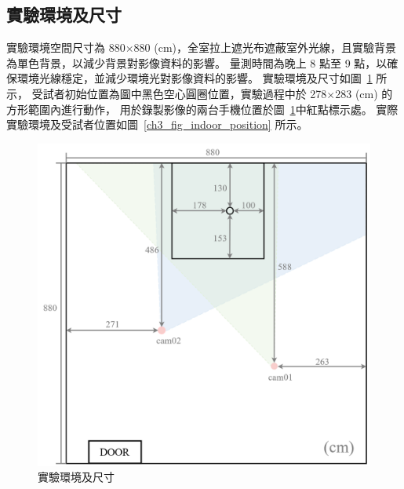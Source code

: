 
\subsection{實驗環境及尺寸}
實驗環境空間尺寸為 880$\times$880 (cm)，全室拉上遮光布遮蔽室外光線，且實驗背景為單色背景，以減少背景對影像資料的影響。
量測時間為晚上 8 點至 9 點，以確保環境光線穩定，並減少環境光對影像資料的影響。
實驗環境及尺寸如圖~\ref{ch3_fig_indoor_scale} 所示，
受試者初始位置為圖中黑色空心圓圈位置，實驗過程中於 278$\times$283 (cm) 的方形範圍內進行動作，
用於錄製影像的兩台手機位置於圖~\ref{ch3_fig_indoor_scale}中紅點標示處。
實際實驗環境及受試者位置如圖~\ref{ch3_fig_indoor_position} 所示。

\begin{figure}[!ht]
   \centering
   \includegraphics[width=\linewidth]{figure/ch3_fig_indoor_scale.png}
    \caption[實驗環境及尺寸]{實驗環境及尺寸}
    \label{ch3_fig_indoor_scale}
\end{figure}


